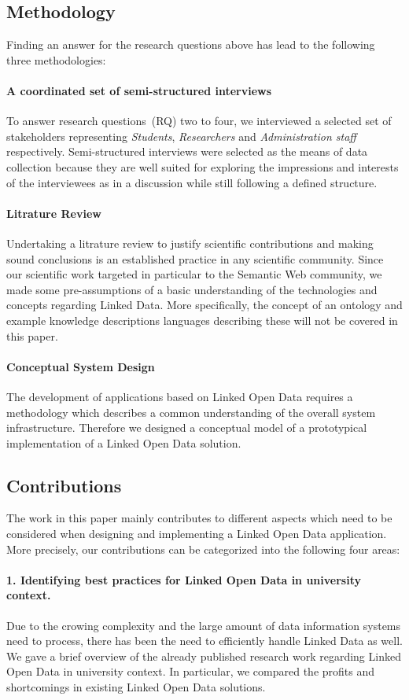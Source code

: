\documentclass{article}
\begin{document}
\subsection{Methodology}
Finding an answer for the research questions above has lead to the following three methodologies:
\paragraph{A coordinated set of semi-structured interviews}
To answer research questions~(RQ) two to four, we interviewed a selected set of stakeholders representing \textit{Students}, \textit{Researchers} and \textit{Administration staff} respectively. Semi-structured interviews were selected as the means of data collection because they are well suited for exploring the impressions and interests of the interviewees as in a discussion while still following a defined structure. 
\paragraph{Litrature Review}
Undertaking a litrature review to justify scientific contributions and making sound conclusions is an established practice in any scientific community. Since our scientific work targeted in particular to the Semantic Web community, we made some pre-assumptions of a basic understanding of the technologies and concepts regarding Linked Data. More specifically, the concept of an ontology and example knowledge descriptions languages describing these will not be covered in this paper. 
\paragraph{Conceptual System Design}
The development of applications based on Linked Open Data requires a methodology which describes a common understanding of the overall system infrastructure. Therefore we designed a conceptual model of a prototypical implementation of a Linked Open Data solution. 

\subsection{Contributions}
The work in this paper mainly contributes to different aspects which need to be considered when designing and implementing a Linked Open Data application.
More precisely, our contributions can be categorized into the following four areas:
\paragraph{1. Identifying best practices for Linked Open Data in university context.}
Due to the crowing complexity and the large amount of data information systems need to process, there has been the need to efficiently handle Linked Data as well. We gave a brief overview of the already published research work regarding Linked Open Data in university context. In particular, we compared the profits and shortcomings in existing Linked Open Data solutions. 
\end{document}
